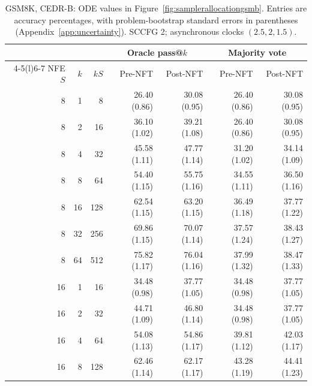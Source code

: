 \documentclass[11pt,letterpaper]{article}
\begin{document}
\begin{table}[p]
\centering\small
\setlength{\tabcolsep}{5pt}
\caption{GSM8K, CEDR-B: ODE values in Figure~\ref{fig:samplerallocationgsmb}. Entries are accuracy percentages, with problem-bootstrap standard errors in parentheses (Appendix~\ref{app:uncertainty}). SCCFG 2; asynchronous clocks $(2.5,2,1.5)$.}
\label{tab:samplerbudgetgsmbode}
\begin{tabular}{@{}rrr rrrr@{}}
\toprule
& & & \multicolumn{2}{c}{Oracle pass@$k$} & \multicolumn{2}{c}{Majority vote} \\
\cmidrule(lr){4-5}\cmidrule(l){6-7}
NFE $S$ & $k$ & $kS$ & Pre-NFT & Post-NFT & Pre-NFT & Post-NFT \\
\midrule
8 & 1 & 8 & 26.40 {\scriptsize (0.86)} & 30.08 {\scriptsize (0.95)} & 26.40 {\scriptsize (0.86)} & 30.08 {\scriptsize (0.95)} \\
8 & 2 & 16 & 36.10 {\scriptsize (1.02)} & 39.21 {\scriptsize (1.08)} & 26.40 {\scriptsize (0.86)} & 30.08 {\scriptsize (0.95)} \\
8 & 4 & 32 & 45.58 {\scriptsize (1.11)} & 47.77 {\scriptsize (1.14)} & 31.20 {\scriptsize (1.02)} & 34.14 {\scriptsize (1.09)} \\
8 & 8 & 64 & 54.40 {\scriptsize (1.15)} & 55.75 {\scriptsize (1.16)} & 34.55 {\scriptsize (1.11)} & 36.50 {\scriptsize (1.16)} \\
8 & 16 & 128 & 62.54 {\scriptsize (1.15)} & 63.20 {\scriptsize (1.15)} & 36.49 {\scriptsize (1.18)} & 37.77 {\scriptsize (1.22)} \\
8 & 32 & 256 & 69.86 {\scriptsize (1.15)} & 70.07 {\scriptsize (1.14)} & 37.57 {\scriptsize (1.24)} & 38.43 {\scriptsize (1.27)} \\
8 & 64 & 512 & 75.82 {\scriptsize (1.17)} & 76.04 {\scriptsize (1.16)} & 37.99 {\scriptsize (1.32)} & 38.47 {\scriptsize (1.33)} \\
\midrule
16 & 1 & 16 & 34.48 {\scriptsize (0.98)} & 37.77 {\scriptsize (1.05)} & 34.48 {\scriptsize (0.98)} & 37.77 {\scriptsize (1.05)} \\
16 & 2 & 32 & 44.71 {\scriptsize (1.09)} & 46.80 {\scriptsize (1.14)} & 34.48 {\scriptsize (0.98)} & 37.77 {\scriptsize (1.05)} \\
16 & 4 & 64 & 54.08 {\scriptsize (1.13)} & 54.86 {\scriptsize (1.17)} & 39.81 {\scriptsize (1.12)} & 42.03 {\scriptsize (1.17)} \\
16 & 8 & 128 & 62.46 {\scriptsize (1.14)} & 62.17 {\scriptsize (1.17)} & 43.28 {\scriptsize (1.19)} & 44.41 {\scriptsize (1.23)} \\

\end{tabular}
\end{table}
\end{document}
